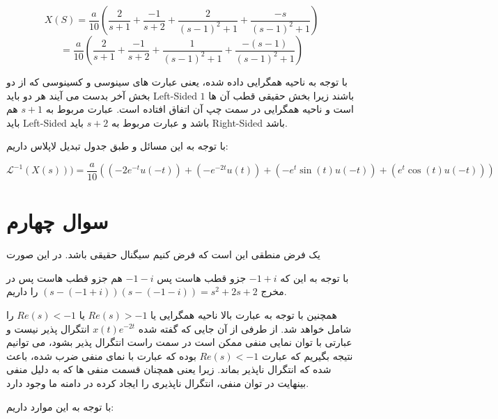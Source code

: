\documentclass[12pt]{article}
\begin{document}
$$X(S)=\frac{a}{10}(\frac{2}{s+1} + \frac{-1}{s+2} + \frac{2  }{(s-1)^2 + 1} + \frac{- s}{(s-1)^2 +1})$$
$$= \frac{a}{10}(\frac{2}{s+1} + \frac{-1}{s+2} + \frac{1  }{(s-1)^2 + 1} + \frac{- (s-1)}{(s-1)^2 +1})$$

با توجه به ناحیه همگرایی داده شده، یعنی عبارت های سینوسی و کسینوسی که از دو بخش آخر بدست می آیند هر دو باید Left-Sided باشند زیرا بخش حقیقی قطب آن ها $1$ است و ناحیه همگرایی در سمت چپ آن اتفاق افتاده است. عبارت مربوط به $s+1$ هم باید Left-Sided باشد و عبارت مربوط به $s+2$ باید Right-Sided باشد.

با توجه به این مسائل و طبق جدول تبدیل لاپلاس داریم:

$$\mathcal{L}^{-1} (X(s)))=\frac{a}{10}\left((-2 e^{-t} u(-t)) + (- e^{-2t}u(t)) + (-e^t \sin(t) u(-t)) + (e^t \cos(t) u(-t))\right)$$


\section{سوال چهارم}

یک فرض منطقی این است که فرض کنیم سیگنال حقیقی باشد. در این صورت

با توجه به این که $-1+i$ جزو قطب هاست پس $-1-i$ هم جزو قطب هاست پس در مخرج
$(s-(-1 + i))(s-(-1 - i)) = s^2 + 2s + 2$
را داریم.

همچنین با توجه به عبارت بالا ناحیه همگرایی یا $Re(s)>-1$ یا $Re(s)<-1$ را شامل خواهد شد. از طرفی از آن جایی که گفته شده
$x(t)e^{-2t}$
انتگرال پذیر نیست و عبارتی با توان نمایی منفی ممکن است در سمت راست انتگرال پذیر بشود، می توانیم نتیجه بگیریم که عبارت
$Re(s)<-1$
 بوده که عبارت با نمای منفی ضرب شده، باعث شده که انتگرال ناپذیر بماند. زیرا یعنی همچنان قسمت منفی ها که به دلیل منفی بینهایت در توان منفی، انتگرال ناپذیری را ایجاد کرده در دامنه ما وجود دارد.

با توجه به این موارد داریم:
\end{document}
